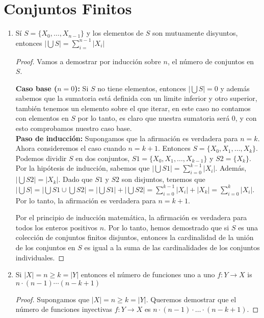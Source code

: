 \documentclass{article}
\begin{document}
\section{Conjuntos Finitos}
\begin{enumerate}
  \item Sí $ S = \{X_0,\ldots,X_{n-1}\}$ y los elementos de $S$ son mutuamente disyuntos, entonces $|\bigcup S|=\sum_{i=}^{n-1}|X_i|$
    \begin{proof}
      Vamos a demostrar por inducción sobre $n$, el número de conjuntos en $S$.

      \textbf{Caso base ($n = 0$):} Si $S$ no tiene elementos, entonces $|\bigcup S| = 0$ y además sabemos que la sumatoria está definida con un limite inferior y otro superior, también tenemos un elemento sobre el que iterar, en este caso no contamos con elementos en $S$ por lo tanto, es claro que nuestra sumatoria será 0, y con esto comprobamos nuestro caso base.\\  
      \textbf{Paso de inducción:} Supongamos que la afirmación es verdadera para $n = k$. Ahora consideremos el caso cuando $n = k + 1$. Entonces $S = \{X_0, X_1, \ldots, X_k\}$. Podemos dividir $S$ en dos conjuntos, $S1 = \{X_0, X_1, \ldots, X_{k-1}\}$ y $S2 = \{X_k\}$. Por la hipótesis de inducción, sabemos que $|\bigcup S1| = \sum_{i=0}^{k-1} |X_i|$. Además, $|\bigcup S2| = |X_k|$. Dado que $S1$ y $S2$ son disjuntos, tenemos que $|\bigcup S| = |\bigcup S1 \cup \bigcup S2| = |\bigcup S1| + |\bigcup S2| = \sum_{i=0}^{k-1} |X_i| + |X_k| = \sum_{i=0}^{k} |X_i|$. Por lo tanto, la afirmación es verdadera para $n = k + 1$.

      Por el principio de inducción matemática, la afirmación es verdadera para todos los enteros positivos $n$. Por lo tanto, hemos demostrado que si $S$ es una colección de conjuntos finitos disjuntos, entonces la cardinalidad de la unión de los conjuntos en $S$ es igual a la suma de las cardinalidades de los conjuntos individuales.
    \end{proof}


  \item Si $|X| = n \geq k = |Y|$ entonces el número de funciones uno a uno $f: Y \rightarrow X $ is $n \cdot (n-1) \cdots (n-k+1)$


    \begin{proof}
      Supongamos que $|X| = n \geq k = |Y|$. Queremos demostrar que el número de funciones inyectivas $f : Y \rightarrow X$ es $n \cdot (n - 1) \cdot \ldots \cdot (n - k + 1)$.


\end{proof}
\end{enumerate}
\end{document}
